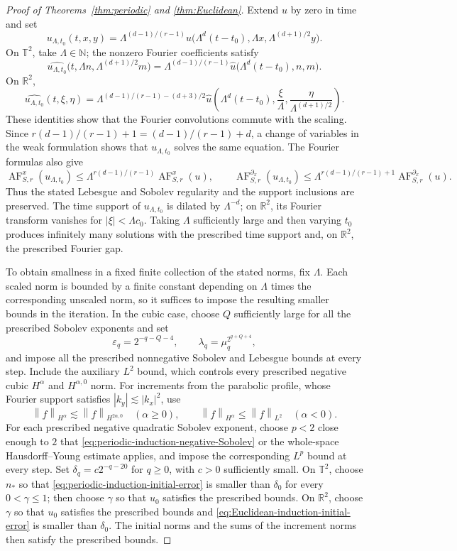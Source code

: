 \documentclass[12pt,reqno,letterpaper]{amsart}
\numberwithin{equation}{section}
\theoremstyle{definition}
\newcommand{\T}{\mathbb T}
\newcommand{\R}{\mathbb R}
\newcommand{\eps}{\varepsilon}
\newcommand{\la}{\lambda}
\newcommand{\norm}[1]{\left\lVert #1\right\rVert}
\newcommand{\abs}[1]{\left\lvert #1\right\rvert}
\begin{document}
\begin{proof}[Proof of Theorems~\ref{thm:periodic} and
\ref{thm:Euclidean}]
Extend $u$ by zero in time and set
\[
 u_{\Lambda,t_0}(t,x,y)
 =\Lambda^{(d-1)/(r-1)}u\bigl(
 \Lambda^d(t-t_0),\Lambda x,\Lambda^{(d+1)/2}y\bigr).
\]
On $\T^2$, take $\Lambda\in\mathbb N$; the
nonzero Fourier coefficients satisfy
\[
 \widehat{u_{\Lambda,t_0}}
 \bigl(t,\Lambda n,\Lambda^{(d+1)/2}m\bigr)
 =\Lambda^{(d-1)/(r-1)}
 \widehat u\bigl(\Lambda^d(t-t_0),n,m\bigr).
\]
On $\R^2$,
\[
 \widehat{u_{\Lambda,t_0}}(t,\xi,\eta)
 =\Lambda^{(d-1)/(r-1)-(d+3)/2}
 \widehat u\left(\Lambda^d(t-t_0),
       \frac\xi\Lambda,\frac\eta{\Lambda^{(d+1)/2}}\right).
\]
These identities show that the Fourier convolutions commute with the
scaling.  Since
$r(d-1)/(r-1)+1=(d-1)/(r-1)+d$, a change of variables in the weak
formulation shows that $u_{\Lambda,t_0}$ solves the same equation.  The
Fourier formulas also give
\[
 \operatorname{AF}_{S,r}^x(u_{\Lambda,t_0})
 \leq\Lambda^{r(d-1)/(r-1)}\operatorname{AF}_{S,r}^x(u),
 \qquad
 \operatorname{AF}^{\partial_x}_{S,r}(u_{\Lambda,t_0})
 \leq\Lambda^{r(d-1)/(r-1)+1}
       \operatorname{AF}^{\partial_x}_{S,r}(u).
\]
Thus the stated Lebesgue and Sobolev regularity and the support inclusions
are preserved.  The
time support of $u_{\Lambda,t_0}$ is dilated by $\Lambda^{-d}$; on
$\R^2$, its Fourier transform vanishes for $\abs\xi<\Lambda c_0$.
Taking $\Lambda$ sufficiently large and then varying $t_0$ produces
infinitely many solutions with the prescribed time support and, on
$\R^2$, the prescribed Fourier gap.

To obtain smallness in a fixed finite collection of the stated norms, fix
$\Lambda$.  Each scaled norm is bounded by a finite constant depending on
$\Lambda$ times the corresponding unscaled norm, so it suffices to impose
the resulting smaller bounds in the iteration.  In the cubic case, choose
$Q$ sufficiently large for all the prescribed Sobolev exponents and set
\[
 \eps_q=2^{-q-Q-4},\qquad \la_q=\mu_q^{2^{q+Q+4}},
\]
and impose all the prescribed nonnegative Sobolev and Lebesgue bounds at
every step.  Include the auxiliary $L^2$ bound, which controls every
prescribed negative cubic $H^\alpha$ and $H^{\alpha,0}$ norm.
For increments from the parabolic profile, whose Fourier support satisfies
$\abs{k_y}\lesssim\abs{k_x}^2$, use
\[
 \norm f_{H^\alpha}\lesssim\norm f_{H^{2\alpha,0}}
 \quad(\alpha\geq0),
 \qquad
 \norm f_{H^\alpha}\leq\norm f_{L^2}
 \quad(\alpha<0).
\]
For each prescribed negative quadratic Sobolev exponent, choose $p<2$
close enough to $2$ that \eqref{eq:periodic-induction-negative-Sobolev}
or the whole-space Hausdorff--Young estimate applies, and impose the
corresponding $L^p$ bound at every step.  Set
$\delta_q=c2^{-q-20}$ for $q\geq0$, with $c>0$ sufficiently small.  On
$\T^2$, choose $n_*$ so that
\eqref{eq:periodic-induction-initial-error} is smaller than $\delta_0$
for every $0<\gamma\leq1$; then choose $\gamma$ so that $u_0$ satisfies
the prescribed bounds.  On $\R^2$, choose $\gamma$ so that $u_0$ satisfies
the prescribed bounds and \eqref{eq:Euclidean-induction-initial-error} is
smaller than $\delta_0$.  The initial norms and the sums of the increment
norms then satisfy the prescribed bounds.

\end{proof}
\end{document}
